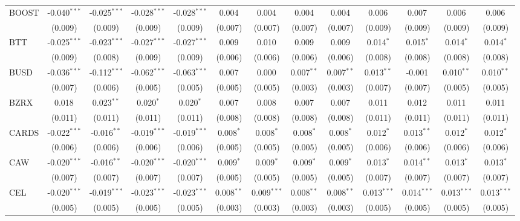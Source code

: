 \begin{table}[!htbp]
\begin{tabular}{@{\extracolsep{5pt}}lcccccccccccc}
 BOOST & -0.040$^{***}$ & -0.025$^{***}$ & -0.028$^{***}$ & -0.028$^{***}$ & 0.004$^{}$ & 0.004$^{}$ & 0.004$^{}$ & 0.004$^{}$ & 0.006$^{}$ & 0.007$^{}$ & 0.006$^{}$ & 0.006$^{}$ \\
  & (0.009) & (0.009) & (0.009) & (0.009) & (0.007) & (0.007) & (0.007) & (0.007) & (0.009) & (0.009) & (0.009) & (0.009) \\
 BTT & -0.025$^{***}$ & -0.023$^{***}$ & -0.027$^{***}$ & -0.027$^{***}$ & 0.009$^{}$ & 0.010$^{}$ & 0.009$^{}$ & 0.009$^{}$ & 0.014$^{*}$ & 0.015$^{*}$ & 0.014$^{*}$ & 0.014$^{*}$ \\
  & (0.009) & (0.008) & (0.009) & (0.009) & (0.006) & (0.006) & (0.006) & (0.006) & (0.008) & (0.008) & (0.008) & (0.008) \\
 BUSD & -0.036$^{***}$ & -0.112$^{***}$ & -0.062$^{***}$ & -0.063$^{***}$ & 0.007$^{}$ & 0.000$^{}$ & 0.007$^{**}$ & 0.007$^{**}$ & 0.013$^{**}$ & -0.001$^{}$ & 0.010$^{**}$ & 0.010$^{**}$ \\
  & (0.007) & (0.006) & (0.005) & (0.005) & (0.005) & (0.005) & (0.003) & (0.003) & (0.007) & (0.007) & (0.005) & (0.005) \\
 BZRX & 0.018$^{}$ & 0.023$^{**}$ & 0.020$^{*}$ & 0.020$^{*}$ & 0.007$^{}$ & 0.008$^{}$ & 0.007$^{}$ & 0.007$^{}$ & 0.011$^{}$ & 0.012$^{}$ & 0.011$^{}$ & 0.011$^{}$ \\
  & (0.011) & (0.011) & (0.011) & (0.011) & (0.008) & (0.008) & (0.008) & (0.008) & (0.011) & (0.011) & (0.011) & (0.011) \\
 CARDS & -0.022$^{***}$ & -0.016$^{**}$ & -0.019$^{***}$ & -0.019$^{***}$ & 0.008$^{*}$ & 0.008$^{*}$ & 0.008$^{*}$ & 0.008$^{*}$ & 0.012$^{*}$ & 0.013$^{**}$ & 0.012$^{*}$ & 0.012$^{*}$ \\
  & (0.006) & (0.006) & (0.006) & (0.006) & (0.005) & (0.005) & (0.005) & (0.005) & (0.006) & (0.006) & (0.006) & (0.006) \\
 CAW & -0.020$^{***}$ & -0.016$^{**}$ & -0.020$^{***}$ & -0.020$^{***}$ & 0.009$^{*}$ & 0.009$^{*}$ & 0.009$^{*}$ & 0.009$^{*}$ & 0.013$^{*}$ & 0.014$^{**}$ & 0.013$^{*}$ & 0.013$^{*}$ \\
  & (0.007) & (0.007) & (0.007) & (0.007) & (0.005) & (0.005) & (0.005) & (0.005) & (0.007) & (0.007) & (0.007) & (0.007) \\
 CEL & -0.020$^{***}$ & -0.019$^{***}$ & -0.023$^{***}$ & -0.023$^{***}$ & 0.008$^{**}$ & 0.009$^{***}$ & 0.008$^{**}$ & 0.008$^{**}$ & 0.013$^{***}$ & 0.014$^{***}$ & 0.013$^{***}$ & 0.013$^{***}$ \\
  & (0.005) & (0.005) & (0.005) & (0.005) & (0.003) & (0.003) & (0.003) & (0.003) & (0.005) & (0.005) & (0.005) & (0.005) \\

\end{tabular}
\end{table}
